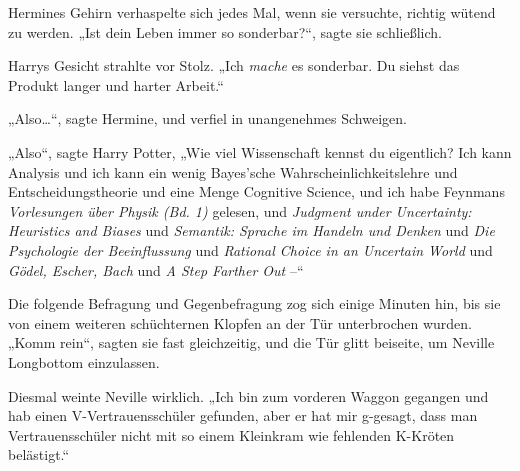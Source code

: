 Hermines Gehirn verhaspelte sich jedes Mal, wenn sie versuchte, richtig wütend zu werden. „Ist dein Leben immer so sonderbar?“, sagte sie schließlich.

Harrys Gesicht strahlte vor Stolz. „Ich \emph{mache} es sonderbar. Du siehst das Produkt langer und harter Arbeit.“

„Also…“, sagte Hermine, und verfiel in unangenehmes Schweigen.

„Also“, sagte Harry Potter, „Wie viel Wissenschaft kennst du eigentlich? Ich kann Analysis und ich kann ein wenig Bayes'sche Wahrscheinlichkeitslehre und Entscheidungstheorie und eine Menge Cognitive Science, und ich habe Feynmans \emph{Vorlesungen über Physik (Bd. 1)} gelesen, und \emph{Judgment under Uncertainty: Heuristics and Biases} und \emph{Semantik: Sprache im Handeln und Denken} und \emph{Die Psychologie der Beeinflussung} und \emph{Rational Choice in an Uncertain World} und \emph{Gödel, Escher, Bach} und \emph{A Step Farther Out} –“

Die folgende Befragung und Gegenbefragung zog sich einige Minuten hin, bis sie von einem weiteren schüchternen Klopfen an der Tür unterbrochen wurden. „Komm rein“, sagten sie fast gleichzeitig, und die Tür glitt beiseite, um Neville Longbottom einzulassen.

Diesmal weinte Neville wirklich. „Ich bin zum vorderen Waggon gegangen und hab einen V-Vertrauensschüler gefunden, aber er hat mir g-gesagt, dass man Vertrauensschüler nicht mit so einem Kleinkram wie fehlenden K-Kröten belästigt.“

